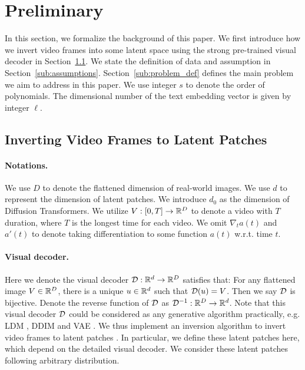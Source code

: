\section{Preliminary}\label{sec:preli}

In this section, we formalize the background of this paper. We first introduce how we invert video frames into some latent space using the strong pre-trained visual decoder in Section~\ref{sub:data}. We state the definition of data and assumption in Section~\ref{sub:assumptions}. Section~\ref{sub:problem_def} defines the main problem we aim to address in this paper. We use integer $s$ to denote the order of polynomials. The dimensional number of the text embedding vector is given by integer $\ell$.

\subsection{Inverting Video Frames to Latent Patches}\label{sub:data}

\paragraph{Notations.} We use $D$ to denote the flattened dimension of real-world images. We use $d$ to represent the dimension of latent patches. We introduce $d_0$ as the dimension of Diffusion Transformers. We utilize $V: [0, T] \rightarrow \mathbb{R}^D$ to denote a video with $T$ duration, where $T$ is the longest time for each video. We omit $\nabla_t a(t)$ and $a'(t)$ to denote taking differentiation to some function $a(t)$ w.r.t. time $t$.

\paragraph{Visual decoder.} Here we denote the visual decoder ${\cal D}: \mathbb{R}^d \rightarrow \mathbb{R}^D$ satisfies that: For any flattened image $V \in \mathbb{R}^D$, there is a unique $u \in \mathbb{R}^d$ such that ${\cal D}(u) = V$. Then we say ${\cal D}$ is bijective. Denote the reverse function of ${\cal D}$ as ${\cal D}^{-1}: \mathbb{R}^D \rightarrow \mathbb{R}^d$. Note that this visual decoder ${\cal D}$ could be considered as any generative algorithm practically, e.g. LDM \cite{rbl+22}, DDIM \cite{sme20} and VAE \cite{k13}. We thus implement an inversion algorithm to invert video frames to latent patches \cite{mha+23}. In particular, we define these latent patches here, which depend on the detailed visual decoder. We consider these latent patches following arbitrary distribution.

